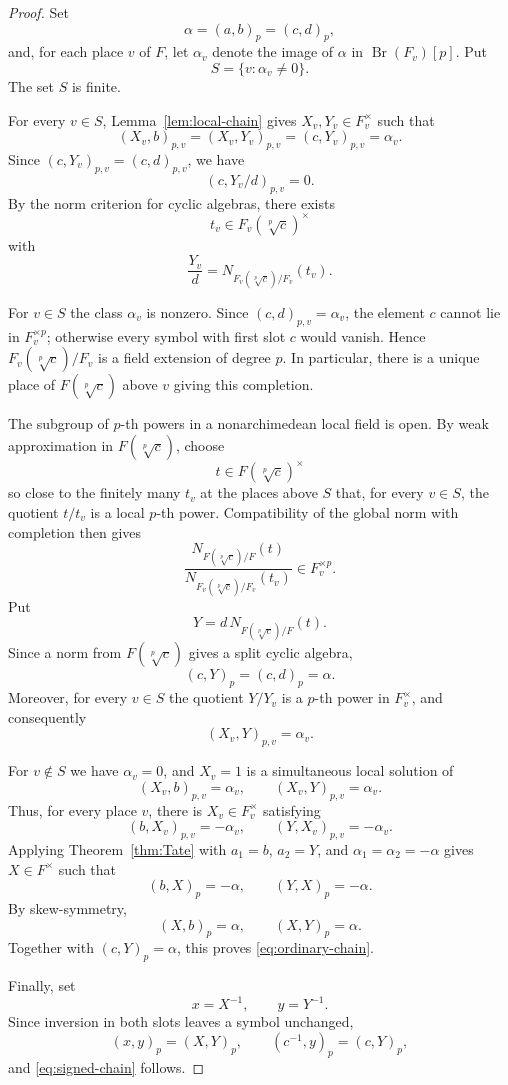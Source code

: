 \documentclass[12pt]{amsart}
\theoremstyle{definition}
\theoremstyle{remark}
\DeclareMathOperator{\Br}{Br}
\begin{document}
\begin{proof}
Set
\[
 \alpha=(a,b)_p=(c,d)_p,
\]
and, for each place $v$ of $F$, let $\alpha_v$ denote the image of $\alpha$
in $\Br(F_v)[p]$. Put
\[
 S=\{v:\alpha_v\neq0\}.
\]
The set $S$ is finite.

For every $v\in S$, Lemma~\ref{lem:local-chain} gives
$X_v,Y_v\in F_v^\times$ such that
\[
 (X_v,b)_{p,v}=(X_v,Y_v)_{p,v}=(c,Y_v)_{p,v}=\alpha_v.
\]
Since $(c,Y_v)_{p,v}=(c,d)_{p,v}$, we have
\[
 (c,Y_v/d)_{p,v}=0.
\]
By the norm criterion for cyclic algebras, there exists
\[
 t_v\in F_v(\sqrt[p]{c})^\times
\]
with
\[
 \frac{Y_v}{d}=N_{F_v(\sqrt[p]{c})/F_v}(t_v).
\]

For $v\in S$ the class $\alpha_v$ is nonzero. Since
$(c,d)_{p,v}=\alpha_v$, the element $c$ cannot lie in $F_v^{\times p}$;
otherwise every symbol with first slot $c$ would vanish. Hence
$F_v(\sqrt[p]{c})/F_v$ is a field extension of degree $p$. In particular,
there is a unique place of $F(\sqrt[p]{c})$ above $v$ giving this completion.

The subgroup of $p$-th powers in a nonarchimedean local field is open. By
weak approximation in $F(\sqrt[p]{c})$, choose
\[
 t\in F(\sqrt[p]{c})^\times
\]
so close to the finitely many $t_v$ at the places above $S$ that, for every
$v\in S$, the quotient $t/t_v$ is a local $p$-th power. Compatibility of
the global norm with completion then gives
\[
 \frac{N_{F(\sqrt[p]{c})/F}(t)}
 {N_{F_v(\sqrt[p]{c})/F_v}(t_v)}
 \in F_v^{\times p}.
\]
Put
\[
 Y=d\,N_{F(\sqrt[p]{c})/F}(t).
\]
Since a norm from $F(\sqrt[p]{c})$ gives a split cyclic algebra,
\[
 (c,Y)_p=(c,d)_p=\alpha.
\]
Moreover, for every $v\in S$ the quotient $Y/Y_v$ is a $p$-th power in
$F_v^\times$, and consequently
\[
 (X_v,Y)_{p,v}=\alpha_v.
\]

For $v\notin S$ we have $\alpha_v=0$, and $X_v=1$ is a simultaneous local
solution of
\[
 (X_v,b)_{p,v}=\alpha_v,
 \qquad
 (X_v,Y)_{p,v}=\alpha_v.
\]
Thus, for every place $v$, there is $X_v\in F_v^\times$ satisfying
\[
 (b,X_v)_{p,v}=-\alpha_v,
 \qquad
 (Y,X_v)_{p,v}=-\alpha_v.
\]
Applying Theorem~\ref{thm:Tate} with
$a_1=b$, $a_2=Y$, and $\alpha_1=\alpha_2=-\alpha$ gives
$X\in F^\times$ such that
\[
 (b,X)_p=-\alpha,
 \qquad
 (Y,X)_p=-\alpha.
\]
By skew-symmetry,
\[
 (X,b)_p=\alpha,
 \qquad
 (X,Y)_p=\alpha.
\]
Together with $(c,Y)_p=\alpha$, this proves
\eqref{eq:ordinary-chain}.

Finally, set
\[
 x=X^{-1},\qquad y=Y^{-1}.
\]
Since inversion in both slots leaves a symbol unchanged,
\[
 (x,y)_p=(X,Y)_p,
 \qquad
 (c^{-1},y)_p=(c,Y)_p,
\]
and \eqref{eq:signed-chain} follows.
\end{proof}
\end{document}
